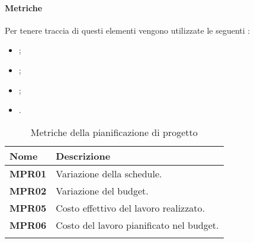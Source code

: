 \paragraph{Metriche}%
Per tenere traccia di questi elementi vengono utilizzate le seguenti :
\begin{itemize}
\item  ;
\item  ;
\item  ;
\item  .
\end{itemize}

\setlength{\freewidth}{\dimexpr\textwidth-0\tabcolsep}
	\renewcommand{\arraystretch}{1.5}
	\setlength{\aboverulesep}{0pt}
	\setlength{\belowrulesep}{0pt}
	\begin{longtable}{L{.365\freewidth} L{.6 \freewidth}}
		\textbf{Nome} & \textbf{Descrizione} \\
		\toprule
		\endhead		
		\textbf{MPR01} & Variazione della schedule. \\
		\textbf{MPR02} & Variazione del budget. \\
		\textbf{MPR05} & Costo effettivo del lavoro realizzato. \\
		\textbf{MPR06} & Costo del lavoro pianificato nel budget. \\
		\bottomrule
		\hiderowcolors
		\caption{Metriche della pianificazione di progetto}
	\end{longtable}


